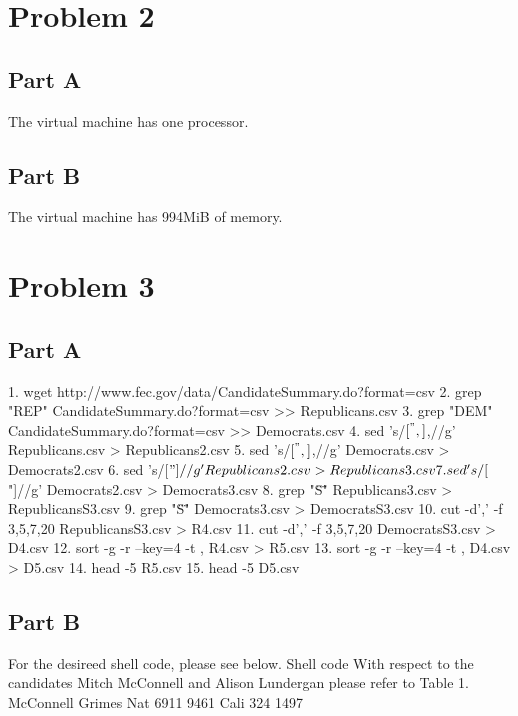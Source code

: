 \section{Problem 2}
\subsection{Part A}
The virtual machine has one processor.
\subsection{Part B}
The virtual machine has 994MiB of memory.
\section{Problem 3}
\subsection{Part A}
1. wget http://www.fec.gov/data/CandidateSummary.do?format=csv
2. grep "REP" CandidateSummary.do?format=csv >> Republicans.csv
3. grep "DEM" CandidateSummary.do?format=csv >> Democrats.csv
4. sed 's/\([^",]\),/\1/g' Republicans.csv > Republicans2.csv
5. sed 's/\([^",]\),/\1/g' Democrats.csv > Democrats2.csv
6. sed 's/[$"]//g' Republicans2.csv > Republicans3.csv
7. sed 's/[$"]//g' Democrats2.csv > Democrats3.csv
8. grep "\"S\"" Republicans3.csv > RepublicansS3.csv
9. grep "\"S\"" Democrats3.csv > DemocratsS3.csv
10. cut -d',' -f 3,5,7,20 RepublicansS3.csv > R4.csv
11. cut -d',' -f 3,5,7,20 DemocratsS3.csv > D4.csv
12. sort -g -r --key=4 -t , R4.csv > R5.csv
13. sort -g -r --key=4 -t , D4.csv > D5.csv
14. head -5 R5.csv
15. head -5 D5.csv
\subsection{Part B}
For the desireed shell code, please see below.
	Shell code
With respect to the candidates Mitch McConnell and Alison Lundergan
please refer to Table 1.
McConnell	Grimes
Nat 6911	9461
Cali 324	1497

